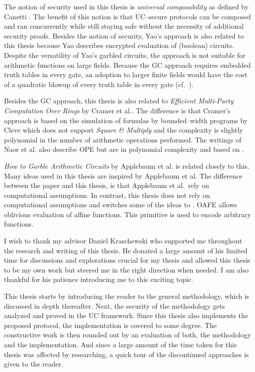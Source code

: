 The notion of security used in this thesis is \emph{universal composability} as
defined by Canetti \cite{canetti05}. The benefit of this notion is that
UC--secure protocols can be composed and ran concurrently while still staying
safe without the necessity of additional security proofs. Besides the notion of
security, Yao's  approach \cite{yao86} is also
related to this thesis because Yao describes encrypted evaluation of (boolean)
circuits.  Despite the versatility of Yao's garbled circuits, the approach is
not suitable for arithmetic functions on large fields. Because the GC approach
requires embedded truth tables in every gate, an adoption to larger finite
fields would have the cost of a quadratic blowup of every truth table in every
gate (cf.\ \cite{naor99privacy}).

Besides the GC approach, this thesis is also related to \emph{Efficient
Multi-Party Computation Over Rings} by Cramer et al.\cite{cramer03}. The
difference is that Cramer's approach is based on the simulation of formulas by
bounded--width programs by Cleve \cite{cleve91} which does not support
\emph{Square \& Multiply} \cite{knuth81} and the complexity is slightly
polynomial in the number of arithmetic operations performed. The writings of
Naor et al.\cite{naor99,naor06} also describe OPE but are in polynomial
complexity and based on  \cite{rabin81}.

\emph{How to Garble Arithmetic Circuits} by Applebaum et al.\cite{gac2012} is
related closely to this. Many ideas used in this thesis are inspired by
Applebaum et al. The difference between the paper and this thesis, is that
Applebaum et al.\ rely on computational assumptions. In contrast, this thesis
does not rely on computational assumptions and switches some of the ideas to
 \cite{davidgoliath}. OAFE
allows oblivious evaluation of affine functions. This primitive is used to
encode arbitrary functions.


%
%

I wish to thank my advisor Daniel Kraschewski who supported me throughout the
research and writing of this thesis. He donated a large amount of his limited
time for discussions and explorations crucial for my thesis and allowed this
thesis to be my own work but steered me in the right direction when needed.  I
am also thankful for his patience introducing me to this exciting topic.


%
%

This thesis starts by introducing the reader to the general methodology, which
is discussed in depth thereafter. Next, the security of the methodology gets
analyzed and proved in the UC framework. Since this thesis also implements the
proposed protocol, the implementation is covered to some degree. The
constructive work is then rounded out by an evaluation of both, the methodology
and the implementation. And since a large amount of the time taken for this
thesis was affected by researching, a quick tour of the discontinued approaches
is given to the reader.

